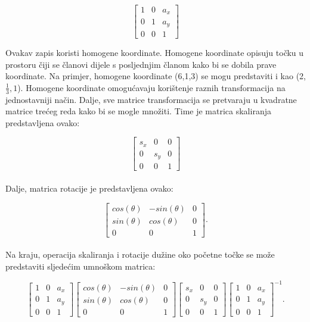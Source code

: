 \documentclass{foi}
\begin{document}
\[
\begin{bmatrix}
	1 & 0 & a_x\\
	0 & 1 & a_y\\
	0 & 0 & 1
\end{bmatrix}
\]

Ovakav zapis koristi homogene koordinate. Homogene koordinate opisuju točku u prostoru čiji se članovi dijele s posljednjim članom kako bi se dobila prave koordinate. Na primjer, homogene koordinate (6,1,3) se mogu predstaviti i kao (2,$\frac{1}{3}, 1$). Homogene koordinate omogućavaju korištenje raznih transformacija na jednostavniji način. Dalje, sve matrice transformacija se pretvaraju u kvadratne matrice trećeg reda kako bi se mogle množiti. Time je matrica skaliranja predstavljena ovako:

\[
\begin{bmatrix}
	s_x & 0 & 0\\
	0 & s_y & 0\\
	0 & 0 & 1
\end{bmatrix}
\]
\\Dalje, matrica rotacije je predstavljena ovako:

\[
\begin{bmatrix}
	cos(\theta) & -sin(\theta) & 0\\
	sin(\theta) & cos(\theta) & 0\\
	0 & 0 & 1
\end{bmatrix}.
\]
\\Na kraju, operacija skaliranja i rotacije dužine oko početne točke se može predstaviti sljedećim umnoškom matrica:

\[
\begin{bmatrix}
	1 & 0 & a_x\\
	0 & 1 & a_y\\
	0 & 0 & 1
\end{bmatrix}
\begin{bmatrix}
	cos(\theta) & -sin(\theta) & 0\\
	sin(\theta) & cos(\theta) & 0\\
	0 & 0 & 1
\end{bmatrix}
\begin{bmatrix}
	s_x & 0 & 0\\
	0 & s_y & 0\\
	0 & 0 & 1
\end{bmatrix}
\begin{bmatrix}
1 & 0 & a_x\\
0 & 1 & a_y\\
0 & 0 & 1
\end{bmatrix}^{-1}.
\]
\end{document}

